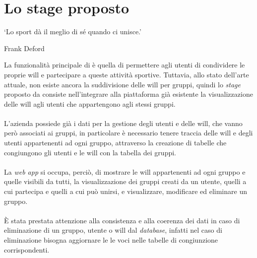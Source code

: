 \section{Lo stage proposto}
\epigraph{\label{eph: sport}\enquote*{Lo sport dà il meglio di sé quando ci
            unisce.}}{Frank Deford}
\noindent La funzionalità principale di \productName è quella di permettere
agli utenti di condividere le proprie
\gls{will} e partecipare a queste attività sportive. Tuttavia, allo stato
dell'arte attuale, non esiste ancora la suddivisione
delle \gls{will}
per gruppi, quindi lo \textit{stage} proposto da \myCompany consiste
nell'integrare
alla piattaforma già esistente
la visualizzazione delle \gls{will} agli utenti che appartengono agli stessi
gruppi.\\ \\
L'azienda possiede già i dati per la gestione degli utenti e delle
\gls{will}, che vanno però associati ai gruppi, in particolare è necessario
tenere
traccia delle \gls{will} e degli utenti appartenenti ad ogni gruppo, attraverso
la creazione di tabelle che congiungono gli
utenti e le \gls{will} con la tabella dei gruppi.\\ \\
La \textit{web app} si occupa, perciò, di mostrare le \gls{will} appartenenti
ad ogni gruppo e quelle visibili da tutti, la visualizzazione dei gruppi creati
da un utente, quelli a cui partecipa e quelli a cui può unirsi, e visualizzare,
modificare ed eliminare un gruppo. \\ \\
È stata prestata attenzione alla consistenza e alla coerenza dei dati in
caso di eliminazione di un gruppo, utente o \gls{will} dal \textit{database},
infatti nel caso di eliminazione bisogna aggiornare le le voci nelle tabelle di
congiunzione corrispondenti.

